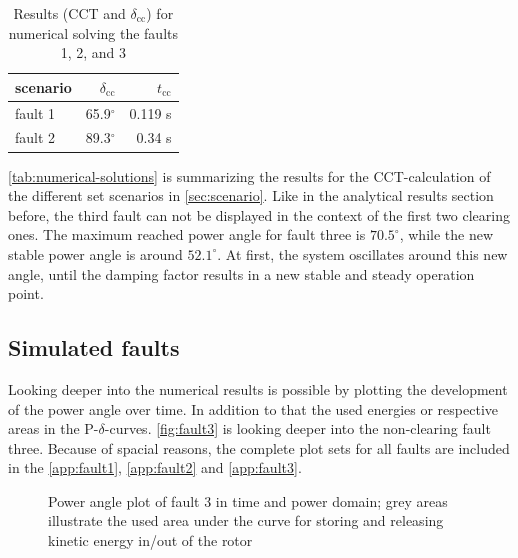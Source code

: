 \begin{table}
        \vspace{-12pt}
        \small
        \centering
        \caption[Numerical results for \acs{CCT}-calculations]{Results (\acs{CCT} and $\delta_\mathrm{cc}$) for numerical solving the faults 1, 2, and 3}
        \label{tab:numerical-solutions}
        \vspace{12pt}
        \begin{tabular}{|l|r|r|}
                \hline
                \rowcolor{lightgray} scenario & $\delta_\mathrm{cc}$ & $t_\mathrm{cc}$ \\ \hline \hline
                fault 1                       & 65.9$^\circ$          & 0.119 s                     \\ \hline
                fault 2                       & 89.3$^\circ$          & 0.34 s                     \\ \hline
        \end{tabular}
\end{table}
\autoref{tab:numerical-solutions} is summarizing the results for the \acs{CCT}-calculation of the different set scenarios in \autoref{sec:scenario}. Like in the analytical results section before, the third fault can not be displayed in the context of the first two clearing ones. The maximum reached power angle for fault three is $70.5^\circ$, while the new stable power angle is around $52.1^\circ$. At first, the system oscillates around this new angle, until the damping factor results in a new stable and steady operation point.

\subsection{Simulated faults}

Looking deeper into the numerical results is possible by plotting the development of the power angle over time. In addition to that the used energies or respective areas in the P-$\delta$-curves. \autoref{fig:fault3} is looking deeper into the non-clearing fault three. Because of spacial reasons, the complete plot sets for all faults are included in the \autoref{app:fault1}, \autoref{app:fault2} and \autoref{app:fault3}.

\begin{figure}[H]
        \centering
        
        \caption[Power angle plot of fault 3]{Power angle plot of fault 3 in time and power domain; grey areas illustrate the used area under the curve for storing and releasing kinetic energy in/out of the rotor}
        \label{fig:fault3}
\end{figure}

